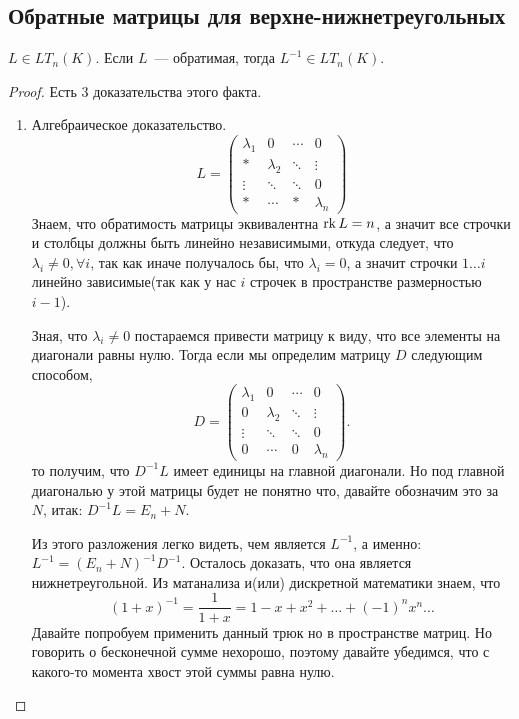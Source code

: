 \subsection{Обратные матрицы для верхне-нижнетреугольных}
\begin{statement}
     $L\in LT_n(K)$. Если $L$~--- обратимая, тогда $L^{-1}\in LT_n(K)$.
\end{statement}
\begin{proof}
    Есть 3 доказательства этого факта.
    \begin{enumerate}
        \item Алгебраическое доказательство.\\
            $$L = 
            \begin{pmatrix}
				\lambda_1&0&\cdots&0\\
                *&\lambda_2&\ddots&\vdots\\
                \vdots&\ddots&\ddots&0\\
                *&\cdots&*&\lambda_n
            \end{pmatrix}$$
            Знаем, что обратимость матрицы эквивалентна $\operatorname{rk} L = n$, а значит все строчки и столбцы
            должны быть линейно независимыми, откуда следует, что $\lambda_i \not= 0, \forall i$, так как иначе
            получалось бы, что $\lambda_i = 0$, а значит строчки $1\dots i$ линейно зависимые(так как
            у нас $i$ строчек в пространстве размерностью $i - 1$).

            Зная, что $\lambda_i \not= 0$ постараемся привести матрицу к виду, что все элементы на диагонали 
            равны нулю.
            Тогда если мы определим матрицу $D$ следующим способом,
            \[
            D = \begin{pmatrix}
                \lambda_1&0&\cdots&0\\
                0&\lambda_2&\ddots&\vdots\\
                \vdots&\ddots&\ddots&0\\
                0&\cdots&0&\lambda_n
            \end{pmatrix}
            .\] 
            то получим, что $D^{-1} L$ имеет единицы на главной диагонали. Но под главной диагональю у этой матрицы будет
            не понятно что, давайте обозначим это за $N$, итак: $D^{-1}L = E_n + N$.

            Из этого разложения легко видеть, чем является $L^{-1}$, а именно: $L^{-1} = (E_n + N)^{-1}D^{-1}$.
            Осталось доказать, что она является нижнетреугольной.
            Из матанализа и(или) дискретной математики знаем, что 
            \[
                (1 + x)^{-1} = \frac{1}{1+x} = 1 - x + x^2 +\dots +(-1)^nx^n\dots
            \]
            Давайте попробуем применить данный трюк но в пространстве матриц.
            Но говорить о бесконечной сумме нехорошо, поэтому давайте убедимся,
            что с какого-то момента хвост этой суммы равна нулю.


\end{enumerate}
\end{proof}
